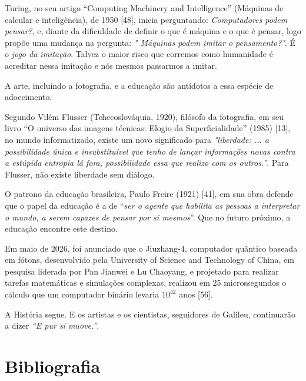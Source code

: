 \documentclass{hipatia}
\begin{document}
	Turing, no seu artigo ``Computing Machinery and Intelligence'' (Máquinas de calcular e inteligência), de 1950 [48], inicia perguntando: \textit{Computadores podem pensar?}, e, diante da dificuldade de definir o que é máquina e o que é pensar, logo propõe uma mudança na pergunta: \textit{" Máquinas podem imitar o pensamento?"}. É o \textit{jogo da imitação}.
	Talvez o maior risco que corremos como humanidade é acreditar nessa imitação e nós mesmos passarmos a imitar. 	
    
    A arte, incluindo a fotografia, e a educação são antídotos a essa espécie de adoecimento.

	Segundo Vilém Flusser (Tchecoslováquia, 1920), filósofo da fotografia, em seu livro ``O universo das imagens técnicas: Elogio da Superficialidade'' (1985) [13], no mundo informatizado, existe um novo significado para \textit{"liberdade: ... a possibilidade única e insubstituível que tenho de lançar informações novas contra a estúpida entropia lá fora, possibilidade essa que realizo com os outros.''}.
Para Flusser, não existe liberdade sem diálogo.

O patrono da educação brasileira, Paulo Freire (1921) [41], em sua obra defende que o papel da educação é a de ``\textit{ser o agente que habilita as pessoas a interpretar o mundo, a serem capazes de pensar por si mesmos}''. Que no futuro próximo, a educação encontre este destino.




Em maio de 2026, foi anunciado que o Jiuzhang-4, computador quântico baseada em fótons, desenvolvido pela University of Science and Technology of China, em pesquisa liderada por Pan Jianwei e Lu Chaoyang, e projetado para realizar tarefas matemáticas e simulações complexas, realizou em 25 microssegundos o cálculo que um computador binário levaria $10^{42}$ anos [56].

A História segue. E os artistas e os cientistas, seguidores de Galileu, continuarão a dizer \textit{``E pur si muove.''}.


\nocite{*}

%

\section{Bibliografia}
\end{document}
